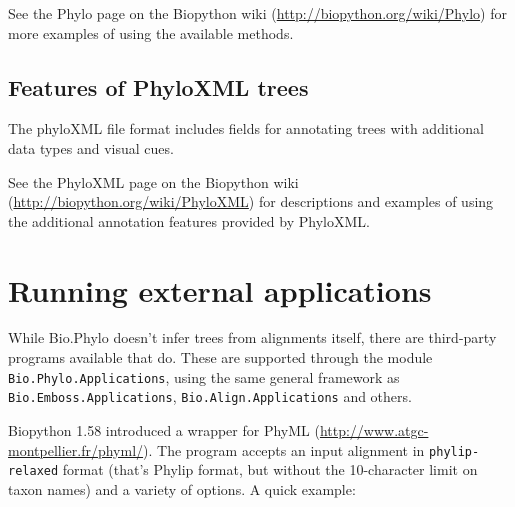 \documentclass{report}
\begin{document}
See the Phylo page on the Biopython wiki (\url{http://biopython.org/wiki/Phylo}) for
more examples of using the available methods.


\subsection{Features of PhyloXML trees}
\label{sec:PhyloXML}

The phyloXML file format includes fields for annotating trees with additional data types and
visual cues.


See the PhyloXML page on the Biopython wiki (\url{http://biopython.org/wiki/PhyloXML}) for
descriptions and examples of using the additional annotation features provided by PhyloXML.





\section{Running external applications}
\label{sec:PhyloApps}

While Bio.Phylo doesn't infer trees from alignments itself, there are third-party
programs available that do. These are supported through the module
\texttt{Bio.Phylo.Applications}, using the same general framework as
\texttt{Bio.Emboss.Applications}, \texttt{Bio.Align.Applications} and others.

Biopython 1.58 introduced a wrapper for PhyML
(\url{http://www.atgc-montpellier.fr/phyml/}). The program accepts an input alignment in
\texttt{phylip-relaxed} format (that's Phylip format, but without the 10-character limit
on taxon names) and a variety of options. A quick example:
\end{document}
